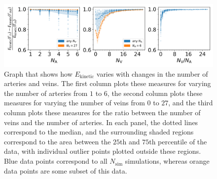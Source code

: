             \begin{figure}
                \centering
                \includegraphics[width=\textwidth]{diagrams/results-variations/mega5_no-arteries_no-veins_veins-to-arteries.png}
                \caption{Graph that shows how $E_\text{kinetic}$ varies with changes in the number of arteries and veins. The first column plots these measures for varying the number of arteries from $1$ to $6$, the second column plots these measures for varying the number of veins from $0$ to $27$, and the third column plots these measures for the ratio between the number of veins and the number of arteries. In each panel, the dotted lines correspond to the median, and the surrounding shaded regions correspond to the area between the $25$th and $75$th percentile of the data, with individual outlier points plotted outside these regions. Blue data points correspond to all $N_\text{sim}$ simulations, whereas orange data points are some subset of this data.}
                \label{fig:mega-vessels5}
            \end{figure}
            

